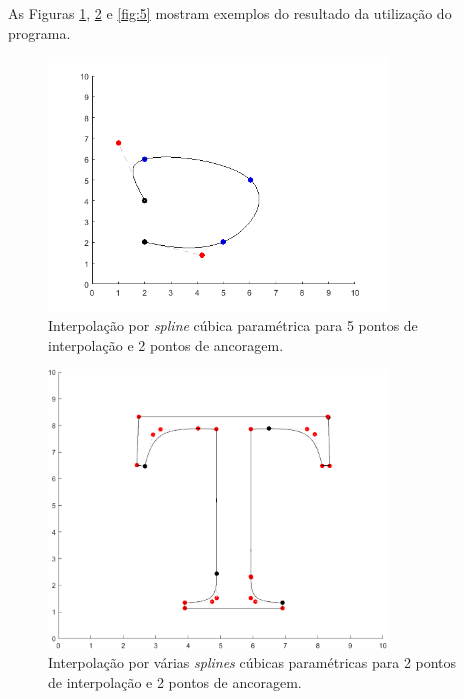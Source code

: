 \documentclass{article}
\begin{document}
\begin{enumerate}
\begin{enumerate}
                    As Figuras \ref{fig:abcde}, \ref{fig:t} e \ref{fig:5} mostram
                    exemplos do resultado da utilização do programa.

                    \begin{figure}[!h]
                        \centering
                        \includegraphics[width=0.8\textwidth]{abcde.png}
                        \caption{Interpolação por \textit{spline} cúbica paramétrica
                        para 5 pontos de interpolação e 2 pontos de ancoragem.}
                        \label{fig:abcde}
                    \end{figure}

                    \begin{figure}[!h]
                        \centering
                        \includegraphics[width=0.8\textwidth]{t.png}
                        \caption{Interpolação por várias \textit{splines} cúbicas paramétricas
                        para 2 pontos de interpolação e 2 pontos de ancoragem.}
                        \label{fig:t}
                    \end{figure}


\end{enumerate}
\end{enumerate}
\end{document}
